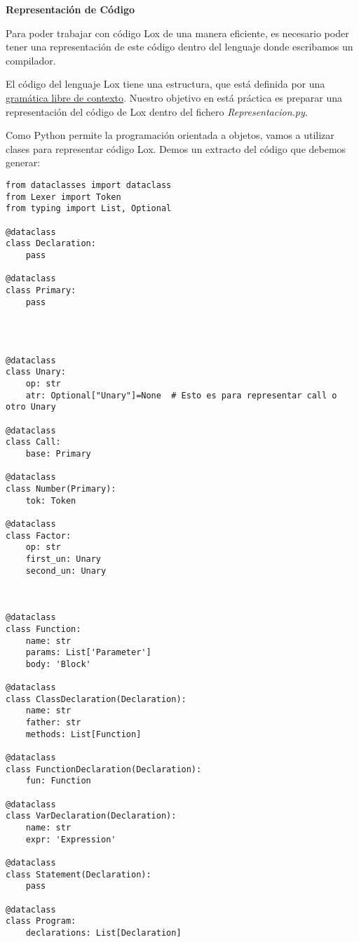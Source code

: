 
\author{Helmut Krauser}
\date{\today}
\title{}


\vspace{5mm}\centerline{\large\bf Representación de Código}\vspace{5mm}
\label{sec:org52fa197}

Para poder trabajar con código Lox de una manera eficiente, es necesario poder 
tener una representación de este código dentro del lenguaje donde escribamos un compilador.

El código del lenguaje Lox tiene una estructura, que está definida por una \href{https://craftinginterpreters.com/appendix-i.html}{gramática libre de contexto}.
Nuestro objetivo en está práctica es preparar una representación del código de Lox dentro del fichero \emph{Representacion.py}.

Como Python permite la programación orientada a objetos, vamos a utilizar clases para representar código Lox.
Demos un extracto del código que debemos generar:
\begin{verbatim}
from dataclasses import dataclass
from Lexer import Token
from typing import List, Optional

@dataclass
class Declaration:
    pass

@dataclass
class Primary:
    pass




@dataclass
class Unary:
    op: str
    atr: Optional["Unary"]=None  # Esto es para representar call o otro Unary

@dataclass
class Call:
    base: Primary

@dataclass
class Number(Primary):
    tok: Token

@dataclass
class Factor:
    op: str
    first_un: Unary
    second_un: Unary

            

@dataclass
class Function:
    name: str
    params: List['Parameter']
    body: 'Block'

@dataclass
class ClassDeclaration(Declaration):
    name: str
    father: str
    methods: List[Function]

@dataclass
class FunctionDeclaration(Declaration):
    fun: Function

@dataclass
class VarDeclaration(Declaration):
    name: str
    expr: 'Expression'

@dataclass
class Statement(Declaration):
    pass

@dataclass
class Program:
    declarations: List[Declaration]


\end{verbatim}

